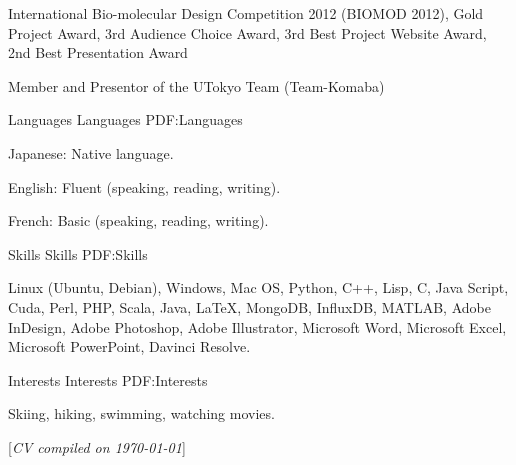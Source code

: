 \documentclass[letterpaper,MMMyyyy,nonstopmode]{simpleresumecv}
\newcommand{\CVNote}{CV compiled on {\today}}
\begin{document}
\begin{Body}
\BulletItem
International Bio-molecular Design Competition 2012 (BIOMOD 2012),
\hfill
{}
\newline
Gold Project Award, 3rd Audience Choice Award, 3rd Best Project Website Award, 2nd Best Presentation Award
\begin{Detail}
\Item
Member and Presentor of the UTokyo Team (Team-Komaba)
\end{Detail}

\Gap


\Section
{Languages}
{Languages}
{PDF:Languages}

\BulletItem
Japanese: Native language.

\Gap
\BulletItem
English: Fluent (speaking, reading, writing).

\Gap
\BulletItem
French: Basic (speaking, reading, writing).


\Section
{Skills}
{Skills}
{PDF:Skills}

\Entry
Linux (Ubuntu, Debian),
Windows,
Mac OS,
Python,
C++,
Lisp,
C,
Java Script,
Cuda,
Perl,
PHP,
Scala,
Java,
{\LaTeX},
MongoDB,
InfluxDB,
MATLAB,
Adobe InDesign,
Adobe Photoshop,
Adobe Illustrator,
Microsoft Word,
Microsoft Excel,
Microsoft PowerPoint,
Davinci Resolve.


\Section
{Interests}
{Interests}
{PDF:Interests}

\Entry
Skiing,
hiking,
swimming,
watching movies.

\end{Body}


\BigGap
\UseNoteFont%
\null\hfill%
[\textit{\CVNote}]
\end{document}
